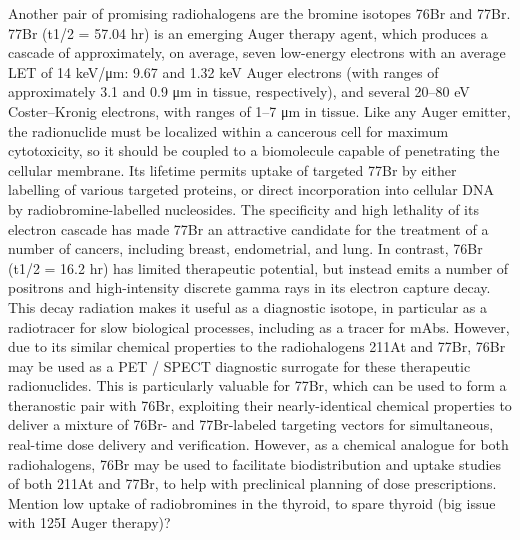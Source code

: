 Another pair of promising radiohalogens are the bromine isotopes 76Br and 77Br. 77Br (t1/2 = 57.04 hr) is an emerging Auger therapy agent, which produces a cascade of approximately, on average, seven low-energy electrons with an average LET of 14 keV/μm: 9.67 and 1.32 keV Auger electrons (with ranges of approximately 3.1 and 0.9 μm in tissue, respectively), and several 20–80 eV Coster–Kronig electrons, with ranges of 1–7 μm in tissue. Like any Auger emitter, the radionuclide must be localized within a cancerous cell for maximum cytotoxicity, so it should be coupled to a biomolecule capable of penetrating the cellular membrane.  Its lifetime permits uptake of targeted 77Br by either labelling of various targeted proteins, or direct incorporation into cellular DNA by radiobromine-labelled nucleosides. The specificity and high lethality of its electron cascade has made 77Br an attractive candidate for the treatment of a number of cancers, including breast, endometrial, and lung. In contrast, 76Br (t1/2 = 16.2 hr) has limited therapeutic potential, but instead emits a number of positrons and high-intensity discrete gamma rays in its electron capture decay. This decay radiation makes it useful as a diagnostic isotope, in particular as a radiotracer for slow biological processes, including as a tracer for mAbs. However, due to its similar chemical properties to the radiohalogens 211At and 77Br, 76Br may be used as a PET / SPECT diagnostic surrogate for these therapeutic radionuclides. This is particularly valuable for 77Br, which can be used to form a theranostic pair with 76Br, exploiting their nearly-identical chemical properties to deliver a mixture of 76Br- and 77Br-labeled targeting vectors for simultaneous, real-time dose delivery and verification. However, as a chemical analogue for both radiohalogens, 76Br may be used to facilitate biodistribution and uptake studies of both 211At and 77Br, to help with preclinical planning of dose prescriptions. Mention low uptake of radiobromines in the thyroid, to spare thyroid (big issue with 125I Auger therapy)?




